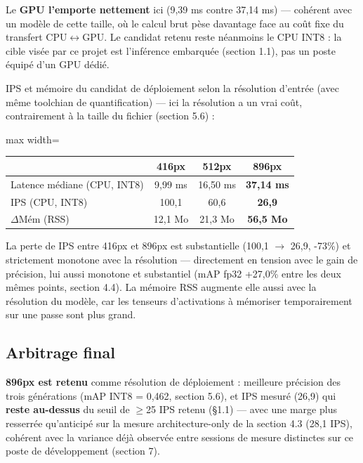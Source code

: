 \documentclass[11pt,a4paper]{article}
\let\Oldsubsection\subsection
\renewcommand{\subsection}{\FloatBarrier\Oldsubsection}
\begin{document}
    
    Le \textbf{GPU l'emporte nettement} ici (9,39 ms contre 37,14 ms) ---
    cohérent avec un modèle de cette taille, où le calcul brut pèse
    davantage face au coût fixe du transfert CPU$\leftrightarrow$GPU. Le
    candidat retenu reste néanmoins le CPU INT8 : la cible visée par ce
    projet est l'inférence embarquée (section 1.1), pas un poste équipé
    d'un GPU dédié.
    
    IPS et mémoire du candidat de déploiement selon la résolution
    d'entrée (avec même toolchian de quantification) --- ici la résolution a un vrai coût, contrairement à la
    taille du fichier (section 5.6) :
    
    \begin{table}[!htbp]
    \centering
    \small
    \begin{adjustbox}{max width=\linewidth}
    \begin{tabular}{@{}lccc@{}}
    \toprule
    & \textbf{416px} & \textbf{512px} & \textbf{896px} \\
    \midrule
    Latence médiane (CPU, INT8) & 9,99 ms & 16,50 ms & \textbf{37,14 ms} \\
    IPS (CPU, INT8) & 100,1 & 60,6 & \textbf{26,9} \\
    $\Delta$Mém (RSS) & 12,1 Mo & 21,3 Mo & \textbf{56,5 Mo} \\
    \bottomrule
    \end{tabular}
    \end{adjustbox}
    \end{table}
    
    La perte de IPS entre 416px et 896px est substantielle (100,1
    $\to$ 26,9, -73\%) et strictement monotone avec la résolution ---
    directement en tension avec le gain de précision, lui aussi monotone
    et substantiel (mAP fp32 +27,0\% entre les deux mêmes points, section
    4.4). La mémoire RSS augmente elle aussi avec la résolution du modèle, car les tenseurs d'activations à mémoriser temporairement sur une passe sont plus grand.
    
    \subsection{Arbitrage final}
    
    \textbf{896px est retenu} comme résolution de déploiement : meilleure
    précision des trois générations (mAP INT8 = 0,462, section 5.6), et
    IPS mesuré (26,9) qui \textbf{reste au-dessus} du seuil de $\geq$25 IPS
    retenu (\S 1.1) --- avec une marge plus resserrée qu'anticipé sur la
    mesure architecture-only de la section 4.3 (28,1 IPS), cohérent avec la
    variance déjà observée entre sessions de mesure distinctes sur ce poste
    de développement (section 7).
\end{document}

